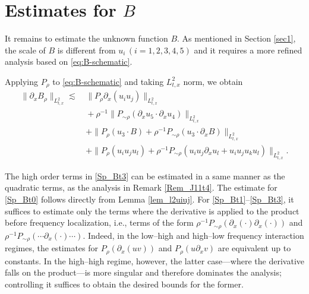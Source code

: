 \documentclass[11pt,letterpaper,reqno]{amsart}
\numberwithin{equation}{section}
\theoremstyle{definition}
\theoremstyle{remark}
\newcommand{\pa}{\partial}
\begin{document}
\section{Estimates for \texorpdfstring{$B$}{B}} \label{sec_B}
It remains to  estimate  the unknown function $ B $. As mentioned in Section \ref{sec1},  the scale of $ B $ is different from $ u_i\, (i=1,2,3,4,5) $ and it requires a more refined analysis based on  \eqref{eq:B-schematic}. 

 
Applying  $P_\rho$ to
\eqref{eq:B-schematic} and taking \(L^2_{t,x}\) norm, we obtain
 \begin{align}
    \|\pa_x B_\rho\|_{L^2_{t,x}}  \lesssim&\, \|P_\rho \pa_x(  u_i   u_j)\|_{L_{t,x}^2 }\label{Sp_Bt0} \\
    &\, + \rho^{-1}\|   P_{\sim \rho} (\pa_x u_5\cdot \pa_x  u_4 )\|_{L^2_{t,x}} \label{Sp_Bt1}\\
    &\, + \|P_\rho ( u_3 \cdot B) + \rho^{-1}  P_{\sim \rho} (  u_3\cdot \pa_x B    )\|_{L^2_{t,x}}\label{Sp_Bt2}  \\
    &\, + \|P_\rho (u_i u_j u_l)  + \rho^{-1}  P_{\sim \rho} (  u_i u_j \pa_x u_l + u_i u_j  u_k u_l ) \|_{L^2_{t,x}} \label{Sp_Bt3}.
\end{align}

The high order terms in \eqref{Sp_Bt3} can be estimated in a same manner as the quadratic terms, as the analysis in Remark \ref{Rem_J11t4}. The estimate for \eqref{Sp_Bt0} follows directly from Lemma \ref{lem_l2uiuj}.
 For \eqref{Sp_Bt1}--\eqref{Sp_Bt3}, it suffices to estimate only the terms where the derivative is applied to the product before frequency localization, i.e., terms of the form  $\rho^{-1}P_{\sim\rho}(\partial_x(\cdot)\partial_x(\cdot))$ and $\rho^{-1}P_{\sim\rho}(\cdots\partial_x(\cdot)\cdots)$. Indeed, in the low–high and high–low frequency interaction regimes, the estimates for $P_\rho(\partial_x(uv))$ and $P_\rho(u\partial_x v)$ are equivalent up to constants. In the high–high regime, however, the latter case—where the derivative falls on the product—is more singular and therefore dominates the analysis; controlling it suffices to obtain the desired bounds for the former.
\end{document}
